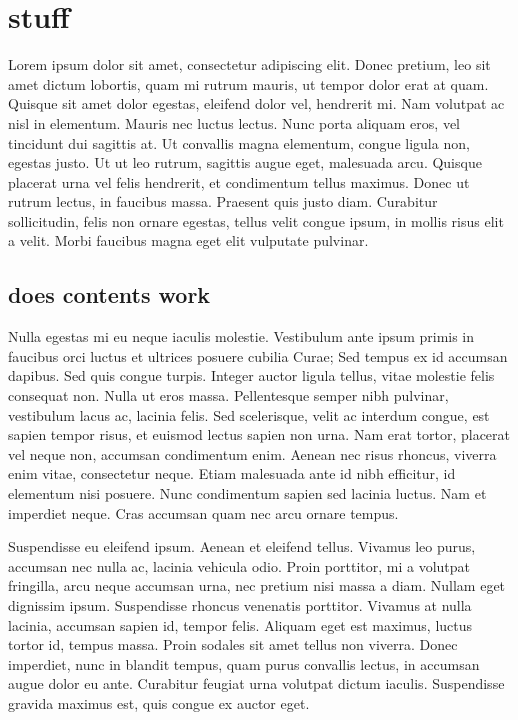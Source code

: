 \documentclass[../main.tex]{subfiles}
\begin{document}
\section{stuff}

Lorem ipsum dolor sit amet, consectetur adipiscing elit. Donec pretium, leo sit amet dictum lobortis, quam mi rutrum mauris, ut tempor dolor erat at quam. Quisque sit amet dolor egestas, eleifend dolor vel, hendrerit mi. Nam volutpat ac nisl in elementum. Mauris nec luctus lectus. Nunc porta aliquam eros, vel tincidunt dui sagittis at. Ut convallis magna elementum, congue ligula non, egestas justo. Ut ut leo rutrum, sagittis augue eget, malesuada arcu. Quisque placerat urna vel felis hendrerit, et condimentum tellus maximus. Donec ut rutrum lectus, in faucibus massa. Praesent quis justo diam. Curabitur sollicitudin, felis non ornare egestas, tellus velit congue ipsum, in mollis risus elit a velit. Morbi faucibus magna eget elit vulputate pulvinar.

\subsection{does contents work}

Nulla egestas mi eu neque iaculis molestie. Vestibulum ante ipsum primis in faucibus orci luctus et ultrices posuere cubilia Curae; Sed tempus ex id accumsan dapibus. Sed quis congue turpis. Integer auctor ligula tellus, vitae molestie felis consequat non. Nulla ut eros massa. Pellentesque semper nibh pulvinar, vestibulum lacus ac, lacinia felis. Sed scelerisque, velit ac interdum congue, est sapien tempor risus, et euismod lectus sapien non urna. Nam erat tortor, placerat vel neque non, accumsan condimentum enim. Aenean nec risus rhoncus, viverra enim vitae, consectetur neque. Etiam malesuada ante id nibh efficitur, id elementum nisi posuere. Nunc condimentum sapien sed lacinia luctus. Nam et imperdiet neque. Cras accumsan quam nec arcu ornare tempus.

Suspendisse eu eleifend ipsum. Aenean et eleifend tellus. Vivamus leo purus, accumsan nec nulla ac, lacinia vehicula odio. Proin porttitor, mi a volutpat fringilla, arcu neque accumsan urna, nec pretium nisi massa a diam. Nullam eget dignissim ipsum. Suspendisse rhoncus venenatis porttitor. Vivamus at nulla lacinia, accumsan sapien id, tempor felis. Aliquam eget est maximus, luctus tortor id, tempus massa. Proin sodales sit amet tellus non viverra. Donec imperdiet, nunc in blandit tempus, quam purus convallis lectus, in accumsan augue dolor eu ante. Curabitur feugiat urna volutpat dictum iaculis. Suspendisse gravida maximus est, quis congue ex auctor eget.
\end{document}
